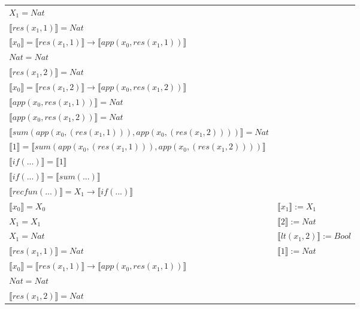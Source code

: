 \begin{exercise}
\begin{description}
\begin{center}
\begin{longtable}[!h]{ | l | l | }
                        $X_1 = Nat$ & \\
                        $ \llbracket res(x_1,1) \rrbracket = Nat$ & \\
                        $ \llbracket x_0 \rrbracket =  \llbracket res(x_1,1) \rrbracket \to  \llbracket app(x_0, res(x_1,1)) \rrbracket$ & \\
                        $Nat = Nat$ & \\
                        $ \llbracket res(x_1,2) \rrbracket = Nat$ & \\
                        $ \llbracket x_0 \rrbracket = \llbracket res(x_1,2) \rrbracket \to  \llbracket app(x_0, res(x_1,2)) \rrbracket$ & \\
                        $ \llbracket app(x_0, res(x_1,1)) \rrbracket = Nat$ & \\
                        $ \llbracket app(x_0, res(x_1,2)) \rrbracket = Nat$ & \\
                        $ \llbracket sum(app(x_0, (res(x_1,1))), app(x_0, (res(x_1,2))))  \rrbracket = Nat$ & \\
                        $ \llbracket 1 \rrbracket =  \llbracket sum(app(x_0, (res(x_1,1))), app(x_0, (res(x_1,2)))) \rrbracket$ & \\
                        $ \llbracket if(...) \rrbracket =  \llbracket 1 \rrbracket$ & \\
                        $ \llbracket if(...) \rrbracket =  \llbracket sum(...) \rrbracket$ & \\
                        $ \llbracket recfun(...) \rrbracket =   X_1  \to  \llbracket if(...) \rrbracket $  & \\
                    \hline
                        $ \llbracket x_0 \rrbracket = X_0$ & $ \llbracket x_1 \rrbracket := X_1$ \\
                        $X_1 = X_1$ & $ \llbracket 2 \rrbracket := Nat$ \\
                        $X_1 = Nat$ & $ \llbracket lt(x_1 , 2) \rrbracket := Bool$ \\
                        $ \llbracket res(x_1,1) \rrbracket = Nat$ & $ \llbracket 1 \rrbracket := Nat$ \\
                        $ \llbracket x_0 \rrbracket =  \llbracket res(x_1,1) \rrbracket \to  \llbracket app(x_0, res(x_1,1)) \rrbracket$ & \\
                        $Nat = Nat$ & \\
                        $ \llbracket res(x_1,2) \rrbracket = Nat$ & \\

\end{longtable}
\end{center}
\end{description}
\end{exercise}
